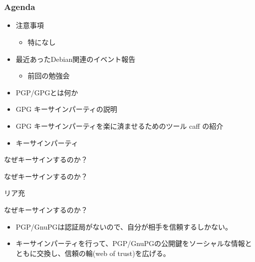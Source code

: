 \frame{\titlepage{}}

\section{}
\begin{frame}
 \frametitle{Agenda}
\begin{minipage}[t]{0.45\hsize}
  \begin{itemize}
  \item 注意事項
	\begin{itemize}
	 \item 特になし
	\end{itemize}
  \item 最近あったDebian関連のイベント報告
	\begin{itemize}
	 \item 前回の勉強会
	\end{itemize}
 \end{itemize}
\end{minipage} 
\begin{minipage}[t]{0.45\hsize}
 \begin{itemize}
  \item PGP/GPGとは何か
  \item GPG キーサインパーティの説明
  \item GPG キーサインパーティを楽に済ませるためのツール caff の紹介
  \item キーサインパーティ
 \end{itemize}
\end{minipage}
\end{frame}


\begin{frame}{なぜキーサインするのか？}

\end{frame}

\begin{frame}{なぜキーサインするのか？}
\begin{center}
\Huge リア充
\end{center}
\end{frame}

\begin{frame}{なぜキーサインするのか？}
\begin{itemize}
\item PGP/GnuPGは認証局がないので、自分が相手を信頼するしかない。
\item キーサインパーティを行って、PGP/GnuPGの公開鍵をソーシャルな情報とともに交換し、信頼の輪(web of
 trust)を広げる。
\end{itemize}
\end{frame}

